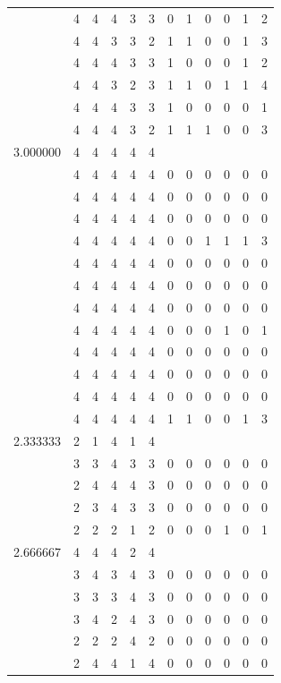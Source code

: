 \documentclass[]{book}
\theoremstyle{definition}
\theoremstyle{definition}
\theoremstyle{definition}
\theoremstyle{remark}
\begin{document}
\begin{table}
{\begin{tabular}[t]{rrrrrrrrrrrr}
 & 4 & 4 & 4 & 3 & 3 & 0 & 1 & 0 & 0 & 1 & 2\\
 & 4 & 4 & 3 & 3 & 2 & 1 & 1 & 0 & 0 & 1 & 3\\
 & 4 & 4 & 4 & 3 & 3 & 1 & 0 & 0 & 0 & 1 & 2\\
 & 4 & 4 & 3 & 2 & 3 & 1 & 1 & 0 & 1 & 1 & 4\\
 & 4 & 4 & 4 & 3 & 3 & 1 & 0 & 0 & 0 & 0 & 1\\
 & 4 & 4 & 4 & 3 & 2 & 1 & 1 & 1 & 0 & 0 & 3\\
3.000000 & 4 & 4 & 4 & 4 & 4 &  &  &  &  &  & \\
 & 4 & 4 & 4 & 4 & 4 & 0 & 0 & 0 & 0 & 0 & 0\\
 & 4 & 4 & 4 & 4 & 4 & 0 & 0 & 0 & 0 & 0 & 0\\
 & 4 & 4 & 4 & 4 & 4 & 0 & 0 & 0 & 0 & 0 & 0\\
 & 4 & 4 & 4 & 4 & 4 & 0 & 0 & 1 & 1 & 1 & 3\\
 & 4 & 4 & 4 & 4 & 4 & 0 & 0 & 0 & 0 & 0 & 0\\
 & 4 & 4 & 4 & 4 & 4 & 0 & 0 & 0 & 0 & 0 & 0\\
 & 4 & 4 & 4 & 4 & 4 & 0 & 0 & 0 & 0 & 0 & 0\\
 & 4 & 4 & 4 & 4 & 4 & 0 & 0 & 0 & 1 & 0 & 1\\
 & 4 & 4 & 4 & 4 & 4 & 0 & 0 & 0 & 0 & 0 & 0\\
 & 4 & 4 & 4 & 4 & 4 & 0 & 0 & 0 & 0 & 0 & 0\\
 & 4 & 4 & 4 & 4 & 4 & 0 & 0 & 0 & 0 & 0 & 0\\
 & 4 & 4 & 4 & 4 & 4 & 1 & 1 & 0 & 0 & 1 & 3\\
2.333333 & 2 & 1 & 4 & 1 & 4 &  &  &  &  &  & \\
 & 3 & 3 & 4 & 3 & 3 & 0 & 0 & 0 & 0 & 0 & 0\\
 & 2 & 4 & 4 & 4 & 3 & 0 & 0 & 0 & 0 & 0 & 0\\
 & 2 & 3 & 4 & 3 & 3 & 0 & 0 & 0 & 0 & 0 & 0\\
 & 2 & 2 & 2 & 1 & 2 & 0 & 0 & 0 & 1 & 0 & 1\\
2.666667 & 4 & 4 & 4 & 2 & 4 &  &  &  &  &  & \\
 & 3 & 4 & 3 & 4 & 3 & 0 & 0 & 0 & 0 & 0 & 0\\
 & 3 & 3 & 3 & 4 & 3 & 0 & 0 & 0 & 0 & 0 & 0\\
 & 3 & 4 & 2 & 4 & 3 & 0 & 0 & 0 & 0 & 0 & 0\\
 & 2 & 2 & 2 & 4 & 2 & 0 & 0 & 0 & 0 & 0 & 0\\
 & 2 & 4 & 4 & 1 & 4 & 0 & 0 & 0 & 0 & 0 & 0\\

\end{tabular}}
\end{table}
\end{document}
